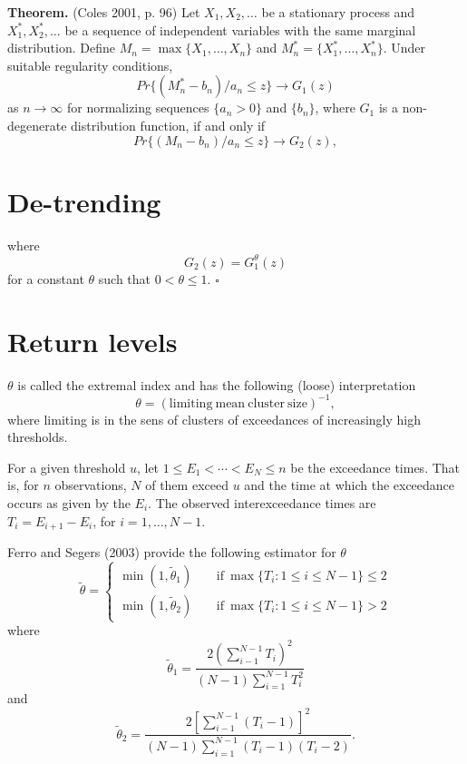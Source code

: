 \documentclass[12pt]{article}
\begin{document}
\textbf{Theorem.} (Coles 2001, p. 96) Let $X_1,X_2,\ldots$ be a stationary process and $X_1^*,X_2^*,\ldots$ be a sequence of independent variables with the same marginal distribution. Define $M_n=\max\{X_1,\ldots,X_n\}$ and $M_n^*=\{X_1^*,\ldots,X_n^*\}$. Under suitable regularity conditions,
\[ Pr\{(M_n^*-b_n)/a_n\leq z\} \rightarrow G_1(z) \]
as $n\rightarrow\infty$ for normalizing sequences $\{a_n > 0\}$ and $\{b_n\}$, where $G_1$ is a non-degenerate distribution function, if and only if
\[ Pr\{(M_n-b_n)/a_n\leq z\} \rightarrow G_2(z), \]                                                                                                                                                                                                                                                         \section{De-trending}
where
\[ G_2(z)=G_1^\theta(z) \]
for a constant $\theta$ such that $0<\theta\leq 1$. \hfill $\square$
\bigskip                                                                                                                                                                                                                                                                                                    \section{Return levels}

$\theta$ is called the extremal index and has the following (loose) interpretation
\[ \theta = (\mathrm{limiting~mean~cluster~size})^{-1}, \]
where limiting is in the sens of clusters of exceedances of increasingly high thresholds.
\bigskip

For a given threshold $u$, let $1\leq E_1 < \cdots < E_N \leq n$ be the exceedance times. That is, for $n$ observations, $N$ of them exceed $u$ and the time at which the exceedance occurs as given by the $E_i$. The observed interexceedance times are $T_i=E_{i+1}-E_i$, for $i=1,\ldots,N-1$.
\bigskip

Ferro and Segers (2003) provide the following estimator for $\theta$
\[ \widetilde{\theta}=\begin{cases} \min(1, \tilde{\theta}_1) & \mathrm{~~~~~if~} \max\{T_i: 1\leq i \leq N-1\} \leq 2  \\ \min(1, \tilde{\theta}_2) & \mathrm{~~~~~if~} \max\{T_i:1\leq i \leq N-1\} > 2 \end{cases} \]
where
\[ \tilde{\theta}_1 = \frac{2\left(\sum_{i-1}^{N-1}T_i\right)^2}{(N-1)\sum_{i=1}^{N-1}T_i^2} \]
and
\[ \tilde{\theta}_2 = \frac{2\left[\sum_{i-1}^{N-1}(T_i-1)\right]^2}{(N-1)\sum_{i=1}^{N-1}(T_i-1)(T_i-2)}. \]
\bigskip
\end{document}
